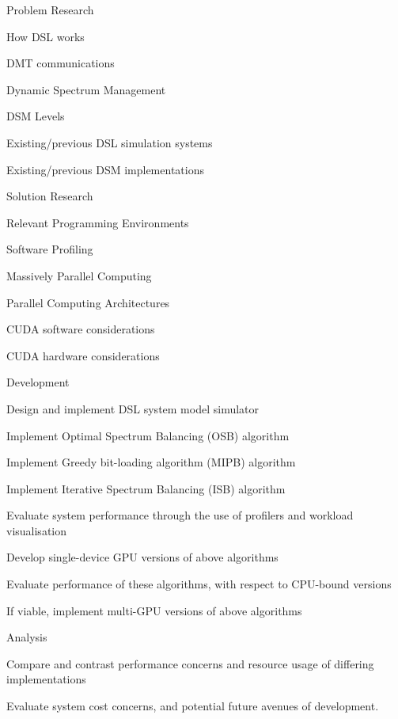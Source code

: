 {{\begin{itemize*}
\setlength{\parsep}{0pt} 
\par
\item Problem Research
  \begin{itemize*}   \item How DSL works
   \item DMT communications
   \item Dynamic Spectrum Management
   \item DSM Levels
   \item Existing/previous DSL simulation systems
   \item Existing/previous DSM implementations
  \end{itemize*}
 \item Solution Research
  \begin{itemize*}   \item Relevant Programming Environments
   \item Software Profiling
   \item Massively Parallel Computing
   \item Parallel Computing Architectures
   \item CUDA software considerations
   \item CUDA hardware considerations
  \end{itemize*}
 \item Development
  \begin{itemize*}   \item Design and implement DSL system model simulator
   \item Implement Optimal Spectrum Balancing (OSB) algorithm
   \item Implement Greedy bit-loading algorithm (MIPB) algorithm
   \item Implement Iterative Spectrum Balancing (ISB) algorithm
   \item Evaluate system performance through the use of profilers and workload visualisation
   \item Develop single-device GPU versions of above algorithms
   \item Evaluate performance of these algorithms, with respect to CPU-bound versions
   \item If viable, implement multi-GPU versions of above algorithms
  \end{itemize*}
 \item Analysis
   \begin{itemize*}    \item Compare and contrast performance concerns and resource usage of differing implementations
    \item Evaluate system cost concerns, and potential future avenues of development.
   \end{itemize*}
\end{itemize*}%
\lthtmlfigureZ
\lthtmlcheckvsize\clearpage}

}
